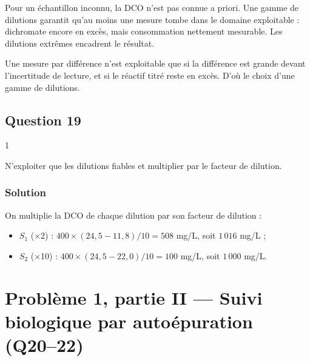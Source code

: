 \documentclass[11pt,a4paper]{article}
\providecommand{\tightlist}{\setlength{\itemsep}{0pt}\setlength{\parskip}{0pt}}
\newcommand{\equationajustee}[1]{%
  \sbox{\boiteequation}{$\displaystyle #1$}%
  \ifdim\wd\boiteequation>\linewidth
    \[\resizebox{\linewidth}{!}{\usebox{\boiteequation}}\]%
  \else
    \[#1\]%
  \fi}
\begin{document}
Pour un échantillon inconnu, la DCO n'est pas connue a priori. Une gamme de dilutions garantit qu'au moins une mesure tombe dans le domaine exploitable : dichromate encore en excès, mais consommation nettement mesurable. Les dilutions extrêmes encadrent le résultat.

\begin{methode}

Une mesure par différence n'est exploitable que si la différence est grande devant l'incertitude de lecture, et si le réactif titré reste en excès. D'où le choix d'une gamme de dilutions.

\end{methode}

\hypertarget{question-19}{%
\subsection{Question 19}\label{question-19}}

\begin{indication}{1}

N'exploiter que les dilutions fiables et multiplier par le facteur de dilution.

\end{indication}

\hypertarget{solution-18}{%
\subsubsection{Solution}\label{solution-18}}

On multiplie la DCO de chaque dilution par son facteur de dilution :

\begin{itemize}
\tightlist
\item
  \(S_1\) (×2) : \(400\times(24{,}5-11{,}8)/10=508\) mg/L, soit \(1\,016\) mg/L ;
\item
  \(S_2\) (×10) : \(400\times(24{,}5-22{,}0)/10=100\) mg/L, soit \(1\,000\) mg/L.
\end{itemize}

\equationajustee{\boxed{\mathrm{DCO}\approx1{,}0\times10^{3}\ \mathrm{mg\,L^{-1}}\text{ de }\mathrm{O_2}}}

\hypertarget{probluxe8me-1-partie-ii-suivi-biologique-par-autouxe9puration-q2022}{%
\section{Problème 1, partie II --- Suivi biologique par autoépuration (Q20--22)}\label{probluxe8me-1-partie-ii-suivi-biologique-par-autouxe9puration-q2022}}
\end{document}
